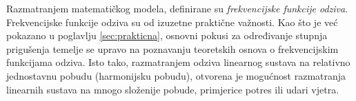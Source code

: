Razmatranjem matematičkog modela, definirane su \textit{frekvencijske funkcije
odziva}. Frekvencijske funkcije odziva su od izuzetne praktične važnosti. Kao što je
već pokazano u poglavlju \ref{sec:prakticna}, osnovni pokusi za određivanje stupnja
prigušenja temelje se upravo na poznavanju teoretskih osnova o frekvencijskim
funkcijama odziva. Isto tako, razmatranjem odziva linearnog sustava na relativno
jednostavnu pobudu (harmonijsku pobudu), otvorena je mogućnost razmatranja linearnih
sustava na mnogo složenije pobude, primjerice potres ili udari vjetra. 

